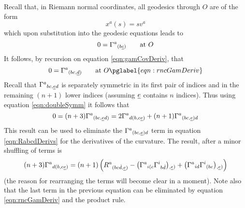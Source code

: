 \documentclass[a4paper,12pt]{article}
\numberwithin{equation}{section}
\begin{document}
Recall that, in Riemann normal coordinates, all geodesics through $O$ are of the form
\[
x^a(s) = s v^a
\]
which upon substitution into the geodesic equations leads to
\[
0 = \Gamma^a{}_{(b\uc)}\qquad\text{at $O$}
\]
It follows, by recursion on equation \eqref{eqn:gamCovDeriv}, that
\begin{equation}
0 = \Gamma^a{}_{(bc,\ud)}\qquad\text{at $O$}
\pglabel{eqn:rncGamDeriv}
\end{equation}
Recall that $\Gamma^a{}_{bc,\ue d}$ is separately symmetric in its first pair of indices and
in the remaining $(n+1)$ lower indices (assuming $\ue$ contains $n$ indices). Thus using
equation \eqref{eqn:doubleSymm} it follows that
\[
0 = (n+3)\Gamma^a{}_{(bc,\ue d)} = 2\Gamma^{a}{}_{d(b,c\ue)}
                                 + (n+1)\Gamma^{a}{}_{(bc,\ue)d}
\]
This result can be used to eliminate the $\Gamma^a{}_{(bc,\ue)d}$ term in equation
\eqref{eqn:RabcdDerivs} for the derivatives of the curvature. The result, after a minor
shuffling of terms is
\[
(n+3)\Gamma^a{}_{d(b,c\ue)} =
        (n+1)\left( R^a{}_{(bc\Dot d,\ue)}
                   - \left(\Gamma^a{}_{i(c}\Gamma^i{}_{b{\Dot d}}\right){}_{\!,\ue)}
                   + \left(\Gamma^a{}_{id}\Gamma^i{}_{(bc}\right){}_{\!,\ue)}
             \right)
\]
(the reason for rearranging the terms will become clear in a moment). Note also that the
last term in the previous equation can be eliminated by equation \eqref{eqn:rncGamDeriv} and
the product rule.
\end{document}
